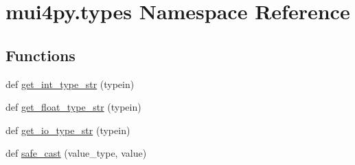 \hypertarget{namespacemui4py_1_1types}{}\section{mui4py.\+types Namespace Reference}
\label{namespacemui4py_1_1types}
\subsection*{Functions}
\begin{DoxyCompactItemize}
\item 
def \hyperlink{namespacemui4py_1_1types_a88f4081fca6fe5878610a54e154c0a40}{get\+\_\+int\+\_\+type\+\_\+str} (typein)
\item 
def \hyperlink{namespacemui4py_1_1types_a8159e2d4feddf7cb3c36b3b2f1fabede}{get\+\_\+float\+\_\+type\+\_\+str} (typein)
\item 
def \hyperlink{namespacemui4py_1_1types_a42f74c5c23a42b1282ce3e6d1dbcd511}{get\+\_\+io\+\_\+type\+\_\+str} (typein)
\item 
def \hyperlink{namespacemui4py_1_1types_acacd4a8ecd70625a7dce64d4b15cfac9}{safe\+\_\+cast} (value\+\_\+type, value)
\end{DoxyCompactItemize}

